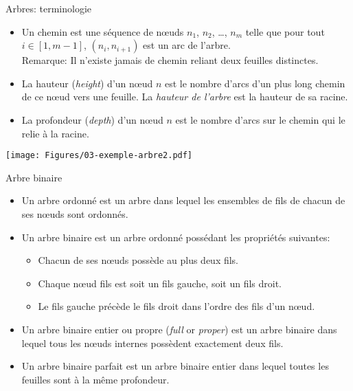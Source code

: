 \begin{frame}{Arbres: terminologie}

\begin{itemize}
\item Un \alert{chemin} est une séquence de n\oe uds $n_1$, $n_2$, \ldots, $n_m$ telle que pour tout $i\in [1,m-1]$, $(n_i,n_{i+1})$ est un arc de l'arbre.\\
Remarque: Il n'existe jamais de chemin reliant deux feuilles distinctes.
\item La \alert{hauteur} (\emph{height}) d'un n\oe ud $n$ est le nombre d'arcs d'un plus long chemin de ce n\oe ud vers une feuille. La \emph{hauteur de l'arbre} est la hauteur de sa racine.
\item La \alert{profondeur} (\emph{depth}) d'un n\oe ud $n$ est le nombre d'arcs sur le chemin qui le relie à la racine.
\end{itemize}

\centerline{\texttt{[image: Figures/03-exemple-arbre2.pdf]}}

\end{frame}

\begin{frame}{Arbre binaire}

\begin{itemize}
\item Un arbre \alert{ordonné} est un arbre dans lequel les ensembles de fils de chacun de ses n\oe uds sont ordonnés.
\item Un arbre \alert{binaire} est un arbre ordonné possédant les propriétés suivantes:
\begin{itemize}
\item Chacun de ses n\oe uds possède au plus deux fils.
\item Chaque n\oe ud fils est soit un fils gauche, soit un fils droit.
\item Le fils gauche précède le fils droit dans l'ordre des fils d'un n\oe ud.
\end{itemize}
\item Un arbre \alert{binaire entier} ou {propre} (\emph{full} or \emph{proper}) est un arbre binaire dans lequel tous les n\oe uds internes possèdent exactement deux fils.
\item Un arbre \alert{binaire parfait} est un arbre binaire entier dans lequel toutes les feuilles sont à la même profondeur.
\end{itemize}

\end{frame}

